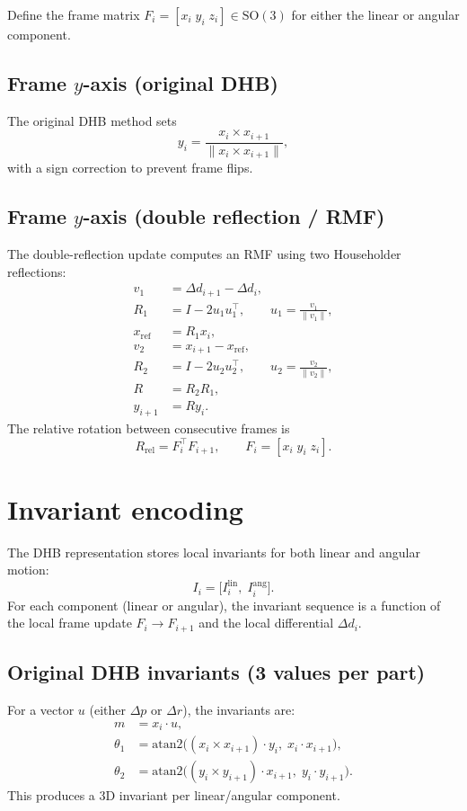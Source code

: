 \documentclass[11pt]{article}
\begin{document}
Define the frame matrix $F_i = [x_i\; y_i\; z_i] \in \mathrm{SO}(3)$ for either the linear or angular component.

\subsection{Frame $y$-axis (original DHB)}
The original DHB method sets
\begin{equation}
  y_i = \frac{x_i \times x_{i+1}}{\lVert x_i \times x_{i+1}\rVert},
\end{equation}
with a sign correction to prevent frame flips.

\subsection{Frame $y$-axis (double reflection / RMF)}
The double-reflection update computes an RMF using two Householder reflections:
\begin{align}
  v_1 &= \Delta d_{i+1} - \Delta d_i, \\
  R_1 &= I - 2 u_1 u_1^\top, \qquad u_1 = \frac{v_1}{\lVert v_1\rVert}, \\
  x_{\mathrm{ref}} &= R_1 x_i, \\
  v_2 &= x_{i+1} - x_{\mathrm{ref}}, \\
  R_2 &= I - 2 u_2 u_2^\top, \qquad u_2 = \frac{v_2}{\lVert v_2\rVert}, \\
  R &= R_2 R_1, \\
  y_{i+1} &= R y_i.
\end{align}
The relative rotation between consecutive frames is
\begin{equation}
  R_{\mathrm{rel}} = F_i^\top F_{i+1}, \qquad F_i = [x_i\; y_i\; z_i].
\end{equation}

\section{Invariant encoding}
The DHB representation stores local invariants for both linear and angular motion:
\begin{equation}
  I_i = \bigl[I_i^{\mathrm{lin}},\; I_i^{\mathrm{ang}}\bigr].
\end{equation}
For each component (linear or angular), the invariant sequence is a function of the local frame update $F_i \to F_{i+1}$ and the local differential $\Delta d_i$.

\subsection{Original DHB invariants (3 values per part)}
For a vector $u$ (either $\Delta p$ or $\Delta r$), the invariants are:
\begin{align}
  m &= x_i \cdot u, \\
  \theta_1 &= \mathrm{atan2}\bigl( (x_i \times x_{i+1}) \cdot y_i,\; x_i \cdot x_{i+1} \bigr), \\
  \theta_2 &= \mathrm{atan2}\bigl( (y_i \times y_{i+1}) \cdot x_{i+1},\; y_i \cdot y_{i+1} \bigr).
\end{align}
This produces a 3D invariant per linear/angular component.
\end{document}

